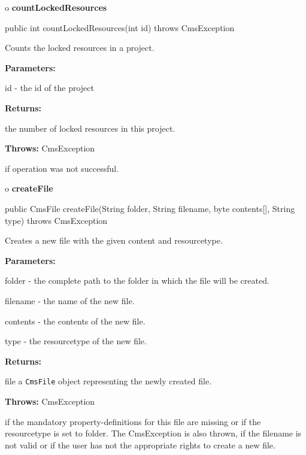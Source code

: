 o {\bf countLockedResources} 

\begin{PRE}
 public int countLockedResources(int id) throws CmsException
\end{PRE}

\begin{description}
\htmlDD Counts the locked resources in a project. 

\begin{description}
\item {\bf Parameters:}  

id - the id of the project  
\item {\bf Returns:}  

the number of locked resources in this project.  
\item {\bf Throws:} CmsException  

if operation was not successful.  
\end{description}

\end{description}

o {\bf createFile} 

\begin{PRE}
 public CmsFile createFile(String folder,
                           String filename,
                           byte contents[],
                           String type) throws CmsException
\end{PRE}

\begin{description}
\htmlDD Creates a new file with the given content and resourcetype.\htmlBR

\begin{description}
\item {\bf Parameters:}  

folder - the complete path to the folder in which the file will be created.  

filename - the name of the new file.  

contents - the contents of the new file.  

type - the resourcetype of the new file.  
\item {\bf Returns:}  

file a {\tt CmsFile} object representing the newly created file.  
\item {\bf Throws:} CmsException  

if the mandatory property-definitions for this file are missing or if the
resourcetype is set to folder. The CmsException is also thrown, if the
filename is not valid or if the user has not the appropriate rights to create
a new file.  
\end{description}

\end{description}

